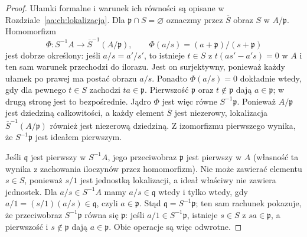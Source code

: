 \begin{proof}
Ułamki formalne i warunek ich równości są opisane
w Rozdziale~\ref{aa:ch:lokalizacja}.
Dla $\mathfrak p\cap S=\varnothing$ oznaczmy przez
$\overline S$ obraz $S$ w $A/\mathfrak p$.
Homomorfizm
\[
\Phi:S^{-1}A\longrightarrow
\overline S^{-1}(A/\mathfrak p),\qquad
\Phi(a/s)=(a+\mathfrak p)/(s+\mathfrak p)
\]
jest dobrze określony: jeśli $a/s=a'/s'$, to istnieje
$t\in S$ z $t(as'-a's)=0$ w $A$ i ten sam warunek
przechodzi do ilorazu. Jest on surjektywny, ponieważ
każdy ułamek po prawej ma postać obrazu $a/s$.
Ponadto $\Phi(a/s)=0$ dokładnie wtedy, gdy dla pewnego
$t\in S$ zachodzi $ta\in\mathfrak p$.
Pierwszość $\mathfrak p$ oraz $t\notin\mathfrak p$ dają
$a\in\mathfrak p$; w drugą stronę jest to bezpośrednie.
Jądro $\Phi$ jest więc równe $S^{-1}\mathfrak p$.
Ponieważ $A/\mathfrak p$ jest dziedziną całkowitości,
a każdy element $\overline S$ jest niezerowy,
lokalizacja $\overline S^{-1}(A/\mathfrak p)$ również
jest niezerową dziedziną. Z izomorfizmu pierwszego wynika,
że $S^{-1}\mathfrak p$ jest ideałem pierwszym.

Jeśli $\mathfrak q$ jest pierwszy w $S^{-1}A$, jego przeciwobraz
$\mathfrak p$ jest pierwszy w $A$ (własność ta wynika z
zachowania iloczynów przez homomorfizm). Nie może zawierać
elementu $s\in S$, ponieważ $s/1$ jest jednostką lokalizacji,
a ideał właściwy nie zawiera jednostek. Dla $a/s\in S^{-1}A$
mamy $a/s\in\mathfrak q$ wtedy i tylko wtedy, gdy
$a/1=(s/1)(a/s)\in\mathfrak q$, czyli $a\in\mathfrak p$.
Stąd $\mathfrak q=S^{-1}\mathfrak p$; ten sam rachunek pokazuje,
że przeciwobraz $S^{-1}\mathfrak p$ równa się $\mathfrak p$:
jeśli $a/1\in S^{-1}\mathfrak p$, istnieje $s\in S$ z
$sa\in\mathfrak p$, a pierwszość i $s\notin\mathfrak p$
dają $a\in\mathfrak p$. Obie operacje są więc odwrotne.
\end{proof}



